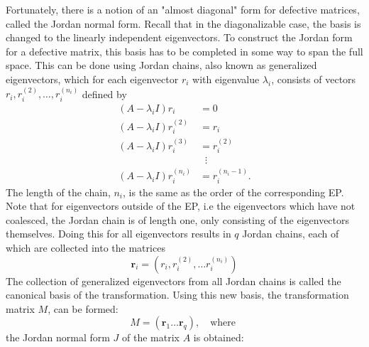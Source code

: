 \documentclass[../main.tex]{subfiles}
\begin{document}
Fortunately, there is a notion of an "almost diagonal" form for defective matrices, called the Jordan normal form. Recall that in the diagonalizable case, the basis is changed to the linearly independent eigenvectors. To construct the Jordan form for a defective matrix, this basis has to be completed in some way to span the full space. This can be done using Jordan chains, also known as generalized eigenvectors, which for each eigenvector $r_i$ with eigenvalue $\lambda_i$, consists of vectors $r_i, r_i^{(2)}, \dots,   r_i^{(n_i)}$ defined by
\begin{equation}\label{jordanchain}
\begin{aligned}
    (A-\lambda_iI)r_i &= 0 \\
    (A-\lambda_iI)r_i^{(2)} &= r_i \\
    (A-\lambda_iI)r_i^{(3)} &= r_i^{(2)} \\
    &\;\;\vdots \\
    (A-\lambda_iI)r_i^{(n_i)} &= r_i^{(n_i-1)}.
\end{aligned}
\end{equation}
The length of the chain, $n_i$, is the same as the order of the corresponding EP. Note that for eigenvectors outside of the EP, i.e the eigenvectors which have not coalesced, the Jordan chain is of length one, only consisting of the eigenvectors themselves. Doing this for all eigenvectors results in $q$ Jordan chains, each of which are collected into the matrices
\begin{equation}
    \boldsymbol{r}_i = (r_i, r_i^{(2)},\dots r_i^{(n_i)})
\end{equation}
The collection of generalized eigenvectors from all Jordan chains is called the canonical basis of the transformation. Using this new basis, the transformation matrix $M$, can be formed:
\begin{equation}\label{chofba}
    M = (\boldsymbol{r}_1 \dots \boldsymbol{r}_q), \quad \text{where } 
\end{equation}
the Jordan normal form $J$ of the matrix $A$ is obtained:
\end{document}
